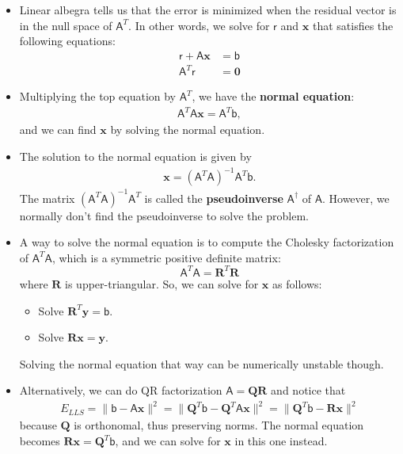\documentclass[10pt]{article}
\newcommand{\ve}[1]{\mathbf{#1}}
\newcommand{\msf}[1]{\mathsf{#1}}
\begin{document}
\begin{itemize}
    \item Linear albegra tells us that the error is minimized 
      when the residual vector is in the null space of 
      $\msf{A}^T$. In other words,
      we solve for $\msf{r}$ and $\ve{x}$ that satisfies
      the following equations:
      \begin{align*}
        \msf{r} + \msf{A}\ve{x} &= \msf{b}\\        
        \msf{A}^T \msf{r} &= \ve{0}
      \end{align*}
      
    \item Multiplying the top equation by $\msf{A}^T$, we have
      the {\bf normal equation}:
      \begin{align*}
        \msf{A}^T \msf{A} \ve{x} = \msf{A}^T \msf{b},
      \end{align*}
      and we can find $\ve{x}$ by solving the normal equation.
      
    \item The solution to the normal equation is given by
      \begin{align*}
        \ve{x} = (\msf{A}^T \msf{A})^{-1} \msf{A}^T \msf{b}.
      \end{align*}
      The matrix $(\msf{A}^T \msf{A})^{-1} \msf{A}^T$
      is called the {\bf pseudoinverse} $\msf{A}^\dagger$
      of $\msf{A}$.
      However, we normally don't find the pseudoinverse to solve the
      problem.
      
    \item A way to solve the normal equation is to compute 
      the Cholesky factorization of $\msf{A}^T \msf{A}$, which is a symmetric 
      positive definite matrix:
      $$\msf{A}^T \msf{A} = \ve{R}^T \ve{R}$$
      where $\ve{R}$ is upper-triangular. So, we can solve 
      for $\ve{x}$ as follows:
      \begin{itemize}        
        \item Solve $\ve{R}^T \ve{y} = \msf{b}$.
        \item Solve $\ve{R}\ve{x} = \ve{y}$.
      \end{itemize}
      Solving the normal equation that way can be 
      numerically unstable though. 
      
    \item Alternatively, we can 
      do QR factorization $\msf{A} = \ve{Q}\ve{R}$ and notice that
      \begin{align*}       
        E_{LLS} 
        = \| \msf{b} - \msf{A}\ve{x} \|^2
        = \| \ve{Q}^T \msf{b} - \ve{Q}^T \msf{A}\ve{x} \|^2
        = \| \ve{Q}^T \msf{b} - \ve{R} \ve{x} \|^2
      \end{align*}
      because $\ve{Q}$ is orthonomal, thus preserving norms.
      The normal equation becomes $\ve{R} \ve{x} = \ve{Q}^T \msf{b}$,
      and we can solve for $\ve{x}$ in this one instead.
      

\end{itemize}
\end{document}
